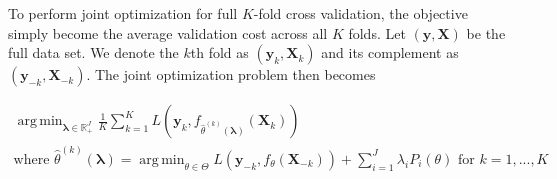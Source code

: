\documentclass[10pt,letterpaper]{article}
\DeclareMathOperator*{\argmin}{arg\,min}
\begin{document}
\begin{algorithm}
\begin{algorithmic}
	\ENDFOR
  \end{algorithmic}
\end{algorithm}

To perform joint optimization for full $K$-fold cross validation, the objective simply become the average validation cost across all $K$ folds. Let $(\boldsymbol y, \boldsymbol{X})$ be the full data set. We denote the $k$th fold as $(\boldsymbol y_{k}, \boldsymbol{X}_{k})$ and its complement as $(\boldsymbol y_{-k}, \boldsymbol{X}_{-k})$. The joint optimization problem then becomes

\begin{equation}
\begin{array}{c}
\argmin_{\boldsymbol{\lambda} \in \mathbb{R}^J_{+}} \frac{1}{K} \sum_{k=1}^K L(\boldsymbol{y}_{k}, f_{\hat{\theta}^{(k)}(\boldsymbol{\lambda})}(\boldsymbol{X}_k)) \\
\text{where } {\hat{\theta}^{(k)}(\boldsymbol{\lambda})} = \argmin_{\theta \in \Theta} L(\boldsymbol{y}_{-k}, f_\theta (\boldsymbol{X}_{-k})) + \sum\limits_{i=1}^J \lambda_i P_i(\theta) \text{ for } k=1,...,K
\end{array}
\label{jointoptFullCV}
\end{equation}
\end{document}
